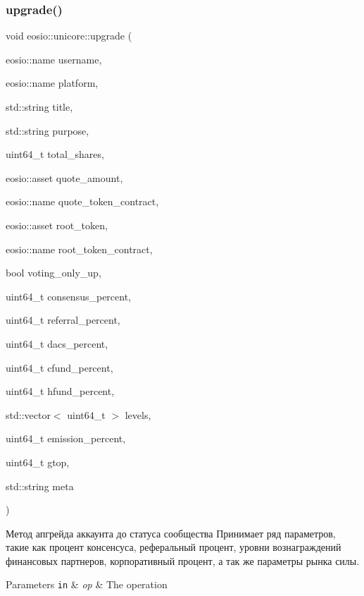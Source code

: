\subsubsection{\texorpdfstring{upgrade()}{upgrade()}}
{\footnotesize\ttfamily void eosio\+::unicore\+::upgrade (\begin{DoxyParamCaption}\item[{eosio\+::name}]{username,  }\item[{eosio\+::name}]{platform,  }\item[{std\+::string}]{title,  }\item[{std\+::string}]{purpose,  }\item[{uint64\+\_\+t}]{total\+\_\+shares,  }\item[{eosio\+::asset}]{quote\+\_\+amount,  }\item[{eosio\+::name}]{quote\+\_\+token\+\_\+contract,  }\item[{eosio\+::asset}]{root\+\_\+token,  }\item[{eosio\+::name}]{root\+\_\+token\+\_\+contract,  }\item[{bool}]{voting\+\_\+only\+\_\+up,  }\item[{uint64\+\_\+t}]{consensus\+\_\+percent,  }\item[{uint64\+\_\+t}]{referral\+\_\+percent,  }\item[{uint64\+\_\+t}]{dacs\+\_\+percent,  }\item[{uint64\+\_\+t}]{cfund\+\_\+percent,  }\item[{uint64\+\_\+t}]{hfund\+\_\+percent,  }\item[{std\+::vector$<$ uint64\+\_\+t $>$}]{levels,  }\item[{uint64\+\_\+t}]{emission\+\_\+percent,  }\item[{uint64\+\_\+t}]{gtop,  }\item[{std\+::string}]{meta }\end{DoxyParamCaption})}



Метод апгрейда аккаунта до статуса сообщества Принимает ряд параметров, такие как процент консенсуса, реферальный процент, уровни вознаграждений финансовых партнеров, корпоративный процент, а так же параметры рынка силы. 


\begin{DoxyParams}[1]{Parameters}
\mbox{\tt in}  & {\em op} & The operation \\
\hline
\end{DoxyParams}
\mbox{\label{classeosio_1_1unicore_a8ffe452ddc02c7f74b0c5e00f0aa22a7}} 
